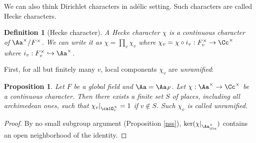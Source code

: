\documentclass{article}
\newtheorem{definition}{Definition}[section]
\newtheorem{proposition}{Proposition}[section]
\begin{document}
We can also think Dirichlet characters in ad\'elic setting. Such characters are called Hecke characters.
\begin{definition}[Hecke character]
A Hecke character $\chi$ is a continuous character of $\Aa^{\times}/F^{\times}$. 
We can write it as $\chi = \prod_{v}\chi_{v}$ where $\chi_{v} =  \chi \circ i_{v}: F_{v}^{\times} \to \Cc^{\times}$ where $i_{v} : F_{v}^{\times} \hookrightarrow \Aa^{\times}$. 
\end{definition}
First, for all but finitely many $v$, local components $\chi_{v}$ are \emph{unramified}:
\begin{proposition}
Let $F$ be a global field and $\Aa = \Aa_F$. Let $\chi:\Aa^{\times}\to \Cc^{\times}$ be a continuous character. 
Then there exists a finite set $S$ of places, including all archimedean ones, such that $\chi_{v}|_{\calO_{v}^{\times}} = 1$ if $v\not\in S$. Such $\chi_{v}$ is called unramified.
\end{proposition}
\begin{proof}
By no small subgroup argument (Proposition \ref{nss}), $\ker (\chi|_{\Aa_{\fin}^{\times}})$ contains an open neighborhood of the identity. 
\end{proof}
\end{document}
